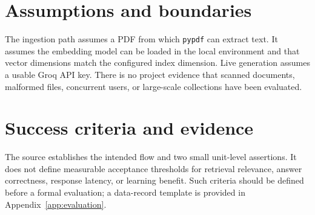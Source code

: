 \section{Assumptions and boundaries}
The ingestion path assumes a PDF from which \texttt{pypdf} can extract text. It assumes the embedding model can be loaded in the local environment and that vector dimensions match the configured index dimension. Live generation assumes a usable Groq API key. There is no project evidence that scanned documents, malformed files, concurrent users, or large-scale collections have been evaluated.

\section{Success criteria and evidence}
The source establishes the intended flow and two small unit-level assertions. It does not define measurable acceptance thresholds for retrieval relevance, answer correctness, response latency, or learning benefit. Such criteria should be defined before a formal evaluation; a data-record template is provided in Appendix~\ref{app:evaluation}.
